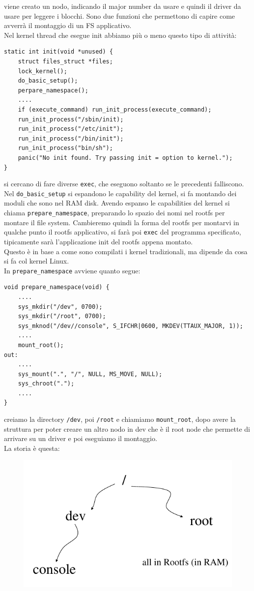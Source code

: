 \documentclass[12pt, oneside]{extbook}
\begin{document}
viene creato un nodo, indicando il major number da usare e quindi il driver da usare per leggere i blocchi. Sono due funzioni che permettono di capire come avverrà il montaggio di un FS applicativo.\\Nel kernel thread che esegue init abbiamo più o meno questo tipo di attività:
\begin{lstlisting}
static int init(void *unused) {
	struct files_struct *files;
	lock_kernel();
	do_basic_setup();
	perpare_namespace();
	....
	if (execute_command) run_init_process(execute_command);
	run_init_process("/sbin/init);
	run_init_process("/etc/init");
	run_init_process("/bin/init");
	run_init_process("bin/sh");
	panic("No init found. Try passing init = option to kernel.");
}
\end{lstlisting}
si cercano di fare diverse \texttt{exec}, che eseguono soltanto se le precedenti falliscono. Nel \texttt{do\_basic\_setup} si espandono le capability del kernel, si fa montando dei moduli che sono nel RAM disk. Avendo espanso le capabilities del kernel si chiama \texttt{prepare\_namespace}, preparando lo spazio dei nomi nel rootfs per montare il file system. Cambieremo quindi la forma del rootfs per montarvi in qualche punto il rootfs applicativo, si farà poi \texttt{exec} del programma specificato, tipicamente sarà l'applicazione init del rootfs appena montato.\\Questo è in base a come sono compilati i kernel tradizionali, ma dipende da cosa si fa col kernel Linux.\\In \texttt{prepare\_namespace} avviene quanto segue:
\begin{lstlisting}
void prepare_namespace(void) {
	....
	sys_mkdir("/dev", 0700);
	sys_mkdir("/root", 0700);
	sys_mknod("/dev//console", S_IFCHR|0600, MKDEV(TTAUX_MAJOR, 1));
	....
	mount_root();
out:
	....
	sys_mount(".", "/", NULL, MS_MOVE, NULL);
	sys_chroot(".");
	....
}
\end{lstlisting}
creiamo la directory \texttt{/dev}, poi \texttt{/root} e chiamiamo \texttt{mount\_root}, dopo avere la struttura per poter creare un altro nodo in dev che è il root node che permette di arrivare su un driver e poi eseguiamo il montaggio.\\La storia è questa:
\begin{figure}[!h]
	\includegraphics[scale=0.5]{immagini/mount_history.png}
\end{figure}
\end{document}
